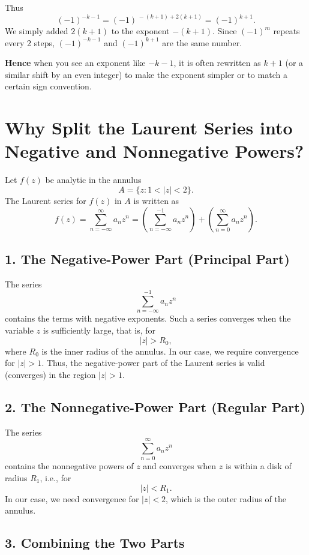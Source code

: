 \documentclass[12pt]{article}
\theoremstyle{definition} %
\theoremstyle{plain} %
\begin{document}
\medskip

Thus
\[
(-1)^{-k-1}
= (-1)^{\,-(k+1) + 2(k+1)}
= (-1)^{k+1}.
\]
We simply added \(2(k+1)\) to the exponent \(-(k+1)\). Since \((-1)^m\) repeats every 2 steps, \((-1)^{-k-1}\) and \((-1)^{k+1}\) are the same number. 

\medskip

\textbf{Hence} when you see an exponent like \(-k-1\), it is often rewritten as \(k+1\) (or a similar shift by an even integer) to make the exponent simpler or to match a certain sign convention.
\section*{Why Split the Laurent Series into Negative and Nonnegative Powers?}

Let \( f(z) \) be analytic in the annulus 
\[
A = \{ z : 1 < |z| < 2 \}.
\]
The Laurent series for \( f(z) \) in \( A \) is written as
\[
f(z) = \sum_{n=-\infty}^{\infty} a_n z^n
= \left(\sum_{n=-\infty}^{-1} a_n z^n \right)
+ \left(\sum_{n=0}^{\infty} a_n z^n \right).
\]

\subsection*{1. The Negative-Power Part (Principal Part)}

The series 
\[
\sum_{n=-\infty}^{-1} a_n z^n
\]
contains the terms with negative exponents. Such a series converges when the variable \(z\) is sufficiently large, that is, for
\[
|z| > R_0,
\]
where \(R_0\) is the inner radius of the annulus. In our case, we require convergence for \(|z| > 1\). Thus, the negative-power part of the Laurent series is valid (converges) in the region \(|z|>1\).

\subsection*{2. The Nonnegative-Power Part (Regular Part)}

The series 
\[
\sum_{n=0}^{\infty} a_n z^n
\]
contains the nonnegative powers of \(z\) and converges when \(z\) is within a disk of radius \(R_1\), i.e., for
\[
|z| < R_1.
\]
In our case, we need convergence for \(|z| < 2\), which is the outer radius of the annulus.

\subsection*{3. Combining the Two Parts}
\end{document}
